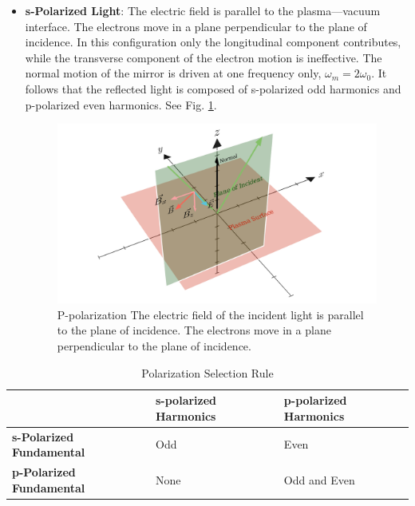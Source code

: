 \documentclass[12pt]{article}
\begin{document}
\begin{itemize}
    \item \textbf{s-Polarized Light}: The electric field is parallel to the plasma—vacuum interface. The electrons move in a plane perpendicular to the plane of incidence. In this configuration only the longitudinal component contributes, while the transverse component of the electron motion is ineffective. The normal motion of the mirror is driven at one frequency only, $\omega_m = 2\omega_0$. It follows that the reflected light is composed of s-polarized odd harmonics and p-polarized even harmonics. See Fig. \ref{fig:s-polarized}.
          \begin{figure}[h]
              \centering
              \includegraphics[width=1\textwidth]{images/s.png}
              \caption{P-polarization The electric field of the incident light is parallel to the plane of incidence. The electrons move in a plane perpendicular to the plane of incidence.}
              \label{fig:s-polarized}
          \end{figure}
\end{itemize}

\begin{table}[h]
    \centering
    \caption{Polarization Selection Rule}
    \vspace{0.5cm}
    \label{tab:selection-rule}
    \begin{tabular}{|l|l|l|}
        \hline
                                         & \textbf{s-polarized Harmonics} & \textbf{p-polarized Harmonics} \\ \hline
        \textbf{s-Polarized Fundamental} & Odd                            & Even                           \\ \hline
        \textbf{p-Polarized Fundamental} & None                           & Odd and Even                   \\ \hline
    \end{tabular}
\end{table}
\end{document}

